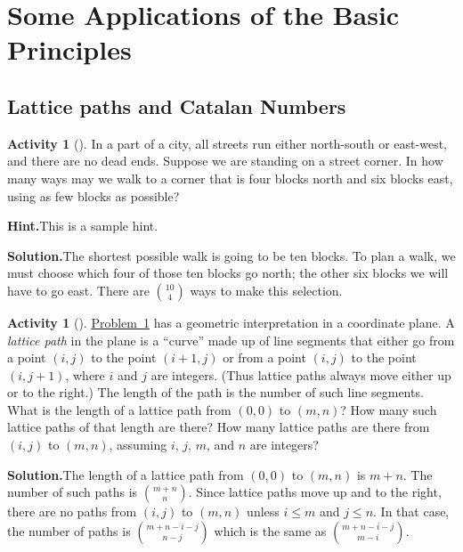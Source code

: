 \documentclass[10pt,]{book}
\theoremstyle{plain}
\theoremstyle{definition}
\newtheorem{activity}[project]{Activity}
\numberwithin{equation}{chapter}
\begin{document}
\section[{Some Applications of the Basic Principles}]{Some Applications of the Basic Principles}\label{section-2}
\typeout{************************************************}
\typeout{************************************************}
\subsection[{Lattice paths and Catalan Numbers}]{Lattice paths and Catalan Numbers}\label{subsection-1}
\begin{activity}[]\label{blockwalking}
In a part of a city, all streets run either north-south or east-west, and there are no dead ends. Suppose we are standing on a street corner. In how many ways may we walk to a corner that is four blocks north and six blocks east, using as few blocks as possible?%
\par\medskip\noindent%
\textbf{Hint.}\quad This is a sample hint.%
\par\medskip\noindent%
\textbf{Solution.}\quad The shortest possible walk is going to be ten blocks. To plan a walk, we must choose which four of those ten blocks go north; the other six blocks we will have to go east. There are \(10\choose 4\) ways to make this selection.%
\end{activity}
\begin{activity}[]\label{latticepaths}
\hyperref[blockwalking]{Problem~\ref{blockwalking}} has a geometric interpretation in a coordinate plane. A \emph{lattice path} in the plane is a ``curve'' made up of line segments that either go from a point \((i,j)\) to the point \((i+1,j)\) or from a point \((i,j)\) to the point \((i,j+1)\), where \(i\) and \(j\) are integers. (Thus lattice paths always move either up or to the right.) The length of the path is the number of such line segments. What is the length of a lattice path from \((0,0)\) to \((m,n)\)? How many such lattice paths of that length are there? How many lattice paths are there from \((i,j)\) to \((m,n)\), assuming \(i\), \(j\), \(m\), and \(n\) are integers?%
\par\medskip\noindent%
\textbf{Solution.}\quad The length of a lattice path from \((0,0)\) to \((m,n)\) is \(m+n\). The number of such paths is \(m+n\choose n\). Since lattice paths move up and to the right, there are no paths from \((i,j)\) to \((m,n)\) unless \(i\le m\) and \(j\le n\). In that case, the number of paths is \(m+n-i-j\choose n-j\) which is the same as \(m+n-i-j\choose m-i\).%
\end{activity}
\end{document}

